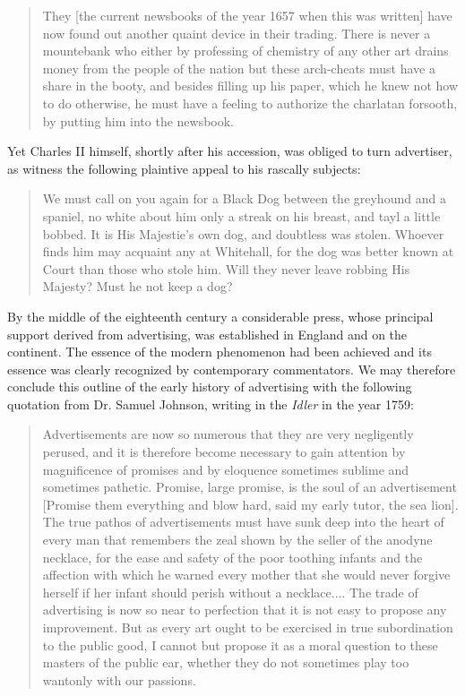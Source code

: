 \documentclass[openany,nobib]{tufte-book}
\begin{document}
\begin{quote}
They {[}the current newsbooks of the year 1657 when this was written{]}
have now found out another quaint device in their trading. There is
never a mountebank who either by professing of chemistry of any other
art drains money from the people of the nation but these arch-cheats
must have a share in the booty, and besides filling up his paper, which
he knew not how to do otherwise, he must have a feeling to authorize the
charlatan forsooth, by putting him into the newsbook.
\end{quote}

Yet Charles II himself, shortly after his accession, was obliged to turn
advertiser, as witness the following plaintive appeal to his rascally
subjects:

\begin{quote}
We must call on you again for a Black Dog between the greyhound and a
spaniel, no white about him only a streak on his breast, and tayl a
little bobbed. It is His Majestie's own dog, and doubtless was stolen.
Whoever finds him may acquaint any at Whitehall, for the dog was better
known at Court than those who stole him. Will they never leave robbing
His Majesty? Must he not keep a dog?
\end{quote}

By the middle of the eighteenth century a considerable press, whose
principal support derived from advertising, was established in England
and on the continent. The essence of the modern phenomenon had been
achieved and its essence was clearly recognized by contemporary
commentators. We may therefore conclude this outline of the early
history of advertising with the following quotation from Dr. Samuel
Johnson, writing in the \emph{Idler} in the year 1759:

\begin{quote}
Advertisements are now so numerous that they are very negligently
perused, and it is therefore become necessary to gain attention by
magnificence of promises and by eloquence sometimes sublime and
sometimes pathetic. Promise, large promise, is the soul of an
advertisement {[}Promise them everything and blow hard, said my early
tutor, the sea lion{]}. The true pathos of advertisements must have sunk
deep into the heart of every man that remembers the zeal shown by the
seller of the anodyne necklace, for the ease and safety of the poor
toothing infants and the affection with which he warned every mother
that she would never forgive herself if her infant should perish without
a necklace.... The trade of advertising is now so near to perfection
that it is not easy to propose any improvement. But as every art ought
to be exercised in true subordination to the public good, I cannot but
propose it as a moral question to these masters of the public ear,
whether they do not sometimes play too wantonly with our passions.
\end{quote}
\end{document}
